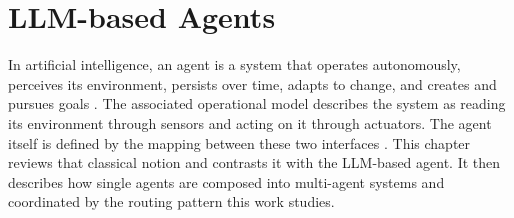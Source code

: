 \chapter{LLM-based Agents}
\label{chap:agents}

In artificial intelligence, an agent is a system that operates autonomously, perceives its environment, persists over time, adapts to change, and creates and pursues goals \cite[Chap.~2]{russellArtificialIntelligenceModern2022}. The associated operational model describes the system as reading its environment through sensors and acting on it through actuators. The agent itself is defined by the mapping between these two interfaces \cite[Chap.~2]{russellArtificialIntelligenceModern2022}. This chapter reviews that classical notion and contrasts it with the LLM-based agent. It then describes how single agents are composed into multi-agent systems and coordinated by the routing pattern this work studies.






